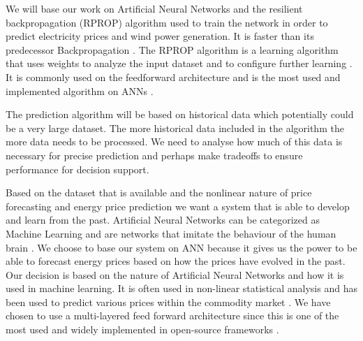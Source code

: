 We will base our work on Artificial Neural Networks and the resilient backpropagation (RPROP) algorithm used to train the network in order to predict electricity prices and wind power generation. It is faster than its predecessor Backpropagation \cite{8,15}.  The RPROP algorithm is a learning algorithm that uses weights to analyze the input dataset and to configure further learning \cite{17}. It is commonly used on the feedforward architecture and is the most used and implemented algorithm on ANNs \cite{14,17}.

The prediction algorithm will be based on historical data which potentially could be a very large dataset. The more historical data included in the algorithm the more data needs to be processed. We need to analyse how much of this data is necessary for precise prediction and perhaps make tradeoffs to ensure performance for decision support.

Based on the dataset that is available and the nonlinear nature of price forecasting and energy price prediction we want a system that is able to develop and learn from the past. Artificial Neural Networks can be categorized as Machine Learning \cite{18} and are networks that imitate the behaviour of the human brain \cite{1}. We choose to base our system on ANN because it gives us the power to be able to forecast energy prices based on how the prices have evolved in the past. Our decision is based on the nature of Artificial Neural Networks and how it is used in machine learning. It is often used in non-linear statistical analysis \cite{16} and has been used to predict various prices within the commodity market \cite{2,3,stockForecasting,pjmForecast}. We have chosen to use a multi-layered feed forward architecture since this is one of the most used and widely implemented in open-source frameworks \cite{17}.